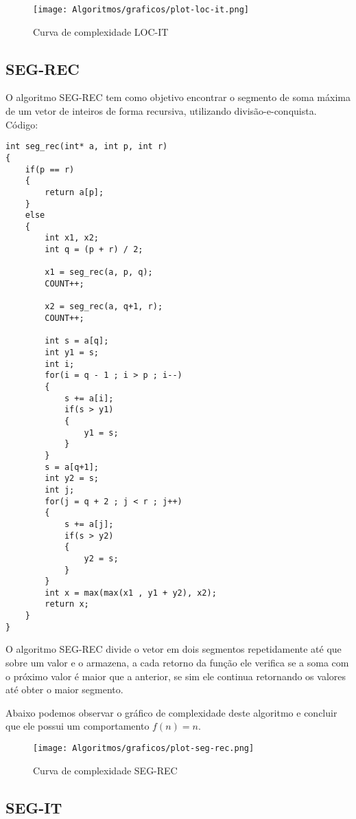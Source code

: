 \documentclass[a4paper, 12pt]{article}
\begin{document}
\begin{figure}[h]
	\centering
	\texttt{[image: Algoritmos/graficos/plot-loc-it.png]}
	\caption{Curva de complexidade LOC-IT}
	\label{fig:loc-it}
\end{figure}

\newpage

\subsection{SEG-REC}

O algoritmo SEG-REC tem como objetivo encontrar o segmento de soma máxima de um vetor de inteiros de forma recursiva, utilizando divisão-e-conquista.\\


Código:

\begin{lstlisting}
int seg_rec(int* a, int p, int r)
{
	if(p == r)
	{
		return a[p];
	}
	else
	{
		int x1, x2;
		int q = (p + r) / 2;
		
		x1 = seg_rec(a, p, q);
		COUNT++;
		
		x2 = seg_rec(a, q+1, r);
		COUNT++;
		
		int s = a[q];
		int y1 = s;
		int i;
		for(i = q - 1 ; i > p ; i--)
		{
			s += a[i];
			if(s > y1)
			{
				y1 = s;
			}
		}
		s = a[q+1];
		int y2 = s;
		int j;
		for(j = q + 2 ; j < r ; j++)
		{
			s += a[j];
			if(s > y2)
			{
				y2 = s;
			}
		}
		int x = max(max(x1 , y1 + y2), x2);
		return x;
	}
}
\end{lstlisting}

O algoritmo SEG-REC divide o vetor em dois segmentos repetidamente até que sobre um valor e o armazena, a cada retorno da função ele verifica se a soma com o próximo valor é maior que a anterior, se sim ele continua retornando os valores até obter o maior segmento.

Abaixo podemos observar o gráfico de complexidade deste algoritmo e concluir que ele possui um comportamento $f(n) = n$.

\begin{figure}[h]
	\centering
	\texttt{[image: Algoritmos/graficos/plot-seg-rec.png]}
	\caption{Curva de complexidade SEG-REC}
	\label{fig:seg-rec}
\end{figure}

\newpage


\subsection{SEG-IT}
\end{document}
